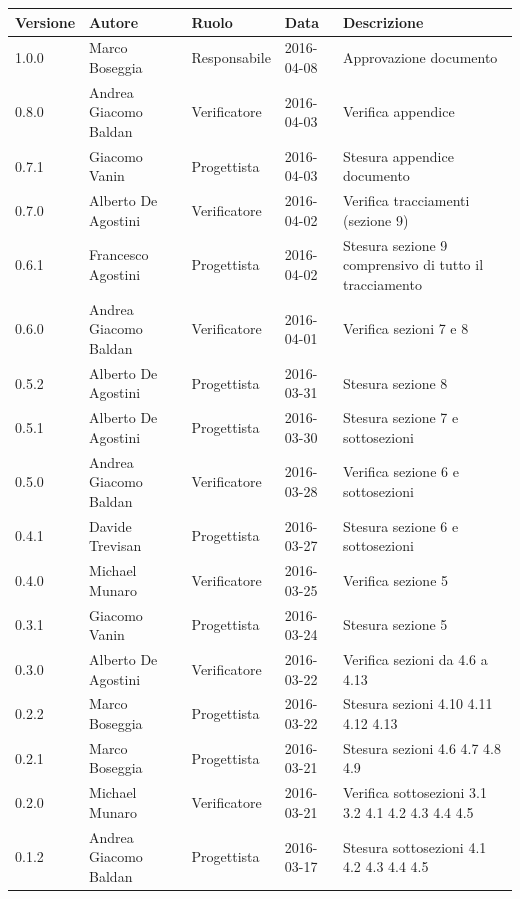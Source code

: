 \documentclass{scalatekids-article}
\begin{document}
\vspace{0cm}
\begin{center}
  \begin{longtable}{| l | l | l | l | p{5cm} |}
    \hline
    Versione & Autore & Ruolo & Data & Descrizione \\
    \hline
    1.0.0 & Marco Boseggia & Responsabile & 2016-04-08 & Approvazione documento\\
    \hline
    0.8.0 & Andrea Giacomo Baldan & Verificatore & 2016-04-03 & Verifica appendice\\
    \hline
    0.7.1 & Giacomo Vanin & Progettista & 2016-04-03 & Stesura appendice documento\\
    \hline
    0.7.0 & Alberto De Agostini & Verificatore & 2016-04-02 & Verifica tracciamenti (sezione 9)\\
    \hline
    0.6.1 & Francesco Agostini & Progettista & 2016-04-02 & Stesura sezione 9 comprensivo di tutto il tracciamento\\
    \hline
    0.6.0 & Andrea Giacomo Baldan & Verificatore & 2016-04-01 & Verifica sezioni 7 e 8 \\
    \hline
    0.5.2 & Alberto De Agostini & Progettista & 2016-03-31 & Stesura sezione 8\\
    \hline
    0.5.1 & Alberto De Agostini & Progettista & 2016-03-30 & Stesura sezione 7 e sottosezioni\\
    \hline
    0.5.0 & Andrea Giacomo Baldan & Verificatore & 2016-03-28 & Verifica sezione 6 e sottosezioni\\
    \hline
    0.4.1 & Davide Trevisan & Progettista & 2016-03-27 & Stesura sezione 6 e sottosezioni\\
    \hline
    0.4.0 & Michael Munaro & Verificatore & 2016-03-25 & Verifica sezione 5\\
    \hline
    0.3.1 & Giacomo Vanin & Progettista & 2016-03-24 & Stesura sezione 5\\
    \hline
    0.3.0 & Alberto De Agostini & Verificatore & 2016-03-22 & Verifica sezioni da 4.6 a 4.13\\
    \hline
    0.2.2 & Marco Boseggia & Progettista & 2016-03-22 & Stesura sezioni 4.10 4.11 4.12 4.13\\
    \hline
    0.2.1 & Marco Boseggia & Progettista & 2016-03-21 & Stesura sezioni 4.6 4.7 4.8 4.9\\
    \hline
    0.2.0 & Michael Munaro & Verificatore & 2016-03-21 & Verifica sottosezioni 3.1 3.2 4.1 4.2 4.3 4.4 4.5\\
    \hline
    0.1.2 & Andrea Giacomo Baldan & Progettista & 2016-03-17 & Stesura sottosezioni 4.1 4.2 4.3 4.4 4.5\\

\end{longtable}
\end{center}
\end{document}

